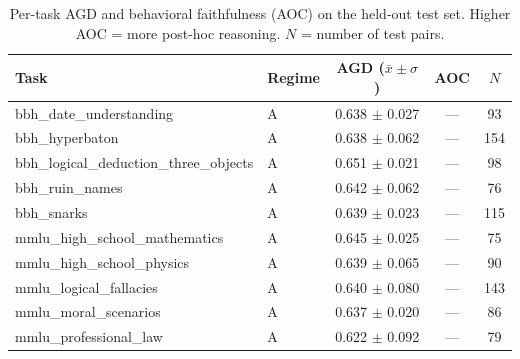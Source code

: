 
\begin{table}[t]
\centering
\small
\caption{Per-task AGD and behavioral faithfulness (AOC) on the held-out test set.
         Higher AOC = more post-hoc reasoning. $N$ = number of test pairs.}
\label{tab:per_task}
\begin{tabular}{llccc}
\toprule
Task & Regime & AGD ($\bar{x} \pm \sigma$) & AOC & $N$ \\
\midrule
bbh\_date\_understanding & A & 0.638 $\pm$ 0.027 & — & 93 \\
bbh\_hyperbaton & A & 0.638 $\pm$ 0.062 & — & 154 \\
bbh\_logical\_deduction\_three\_objects & A & 0.651 $\pm$ 0.021 & — & 98 \\
bbh\_ruin\_names & A & 0.642 $\pm$ 0.062 & — & 76 \\
bbh\_snarks & A & 0.639 $\pm$ 0.023 & — & 115 \\
mmlu\_high\_school\_mathematics & A & 0.645 $\pm$ 0.025 & — & 75 \\
mmlu\_high\_school\_physics & A & 0.639 $\pm$ 0.065 & — & 90 \\
mmlu\_logical\_fallacies & A & 0.640 $\pm$ 0.080 & — & 143 \\
mmlu\_moral\_scenarios & A & 0.637 $\pm$ 0.020 & — & 86 \\
mmlu\_professional\_law & A & 0.622 $\pm$ 0.092 & — & 79 \\
\bottomrule
\end{tabular}
\end{table}
